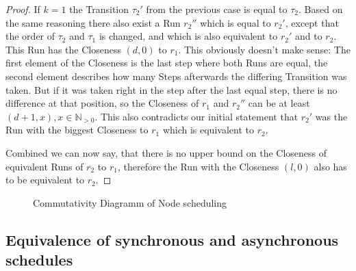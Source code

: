 \begin{proof}
If \(k = 1\) the Transition \(\tau_2'\) from the previous case is equal to \(\tau_2\).
Based on the same reasoning there also exist a Run \(r_2''\) which is equal to \(r_2'\), except that the order of \(\tau_2\) and \(\tau_1\) is changed, and which is also equivalent to \(r_2'\) and to \(r_2\).
This Run has the Closeness \((d, 0)\) to \(r_1\).
This obviously doesn't make sense: The first element of the Closeness is the last step where both Runs are equal, the second element describes how many Steps afterwards the differing Transition was taken.
But if it was taken right in the step after the last equal step, there is no difference at that position, so the Closeness of \(r_1\) and \(r_2''\) can be at least \((d+1, x), x \in \mathbb{N}_{>0}\).
This also contradicts our initial statement that \(r_2'\) was the Run with the biggest Closeness to \(r_1\) which is equivalent to \(r_2\).

Combined we can now say, that there is no upper bound on the Closeness of equivalent Runs of \(r_2\) to \(r_1\), therefore the Run with the Closeness \((l, 0)\) also has to be equivalent to \(r_2\).

\end{proof}


\begin{figure}
  \caption{Commutativity Diagramm of Node scheduling}
\label{fig:chap3:sec_sync:commutativity_scheduling}
\end{figure}



\subsection{Equivalence of synchronous and asynchronous schedules}
\label{sec:concepts:equivalence_without_timing:sync_async}

